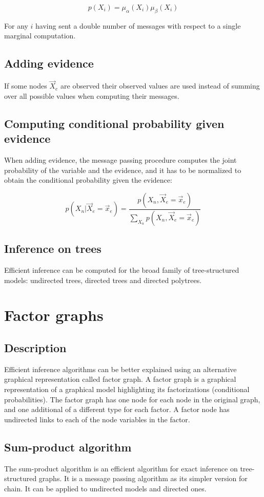 	$$p(X_i) = \mu_\alpha(X_i)\mu_\beta(X_i)$$

	For any $i$ having sent a double number of messages with respect to a single marginal computation.

	\subsection{Adding evidence}
  If some nodes $\vec{X}_e$ are observed their observed values are used instead of summing over all possible values when computing their messages.

	\subsection{Computing conditional probability given evidence}
	When adding evidence, the message passing procedure computes the joint probability of the variable and the evidence, and it has to be normalized to obtain the conditional probability given the evidence:

  $$p(X_n|\vec{X}_e =\vec{x}_e) = \frac{p(X_n, \vec{X}_e = \vec{x}_e)}{\sum\limits_{X_n}p(X_n, \vec{X}_e = \vec{x}_e)}$$

	\subsection{Inference on trees}
	Efficient inference can be computed for the broad family  of tree-structured models: undirected trees, directed trees and directed polytrees.

\section{Factor graphs}

	\subsection{Description}
	Efficient inference algorithms can be better explained using an alternative graphical representation called factor graph.
	A factor graph is a graphical representation of a graphical model highlighting its factorizations (conditional probabilities).
	The factor graph has one node for each node in the original graph, and one additional of a different type for each factor.
	A factor node has undirected links to each of the node variables in the factor.

	\subsection{Sum-product algorithm}
	The sum-product algorithm is an efficient algorithm for exact inference on tree-structured graphs.
	It is a message passing algorithm as its simpler version for chain.
	It can be applied to undirected models and directed ones.

